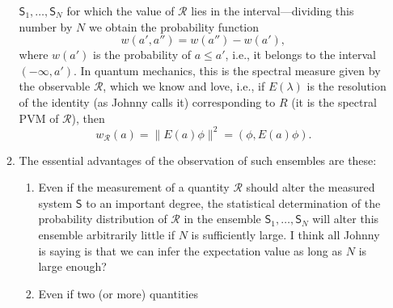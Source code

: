 \documentclass[a4paper]{article}
\theoremstyle{definition}
\theoremstyle{plain}
\begin{document}
\begin{enumerate}
\begin{enumerate}
                    $\mathsf{S}_1,\ldots,\mathsf{S}_N$ for
                    which the value of $\mathcal{R}$ lies in
                    the interval---dividing this number by
                    $N$ we obtain the probability function
                    \begin{equation}
                        w(a',a'')
                        = w(a'') - w(a'),
                    \end{equation}
                    where $w(a')$ is the probability of $a
                    \leq a'$, i.e., it belongs to the
                    interval $(-\infty,a')$. In quantum
                    mechanics, this is the spectral measure
                    given by the observable $\mathcal{R}$,
                    which we know and love, i.e., if
                    $E(\lambda)$ is the resolution of the
                    identity (as Johnny calls it)
                    corresponding to $R$ (it is the spectral
                    PVM of $\mathcal{R}$), then
                    \begin{equation}
                        w_{\mathcal{R}}(a)
                        = \|E(a)\phi\|^2
                        = (\phi,E(a)\phi).
                    \end{equation}
                \item The essential advantages of the
                    observation of such ensembles are these:
                    \begin{enumerate}
                        \item Even if the measurement of a
                            quantity $\mathcal{R}$ should
                            alter the measured system
                            $\mathsf{S}$ to an important
                            degree, the statistical
                            determination of the probability
                            distribution of $\mathcal{R}$ in
                            the ensemble
                            $\mathsf{S}_1,\ldots,\mathsf{S}_N$ 
                            will alter this ensemble
                            arbitrarily little if $N$ is
                            sufficiently large. {\color{blue}
                            I think all Johnny is saying is
                            that we can infer the
                            expectation value as long as $N$
                            is large enough?}
                        \item Even if two (or more)
                            quantities

\end{enumerate}
\end{enumerate}
\end{enumerate}
\end{document}
